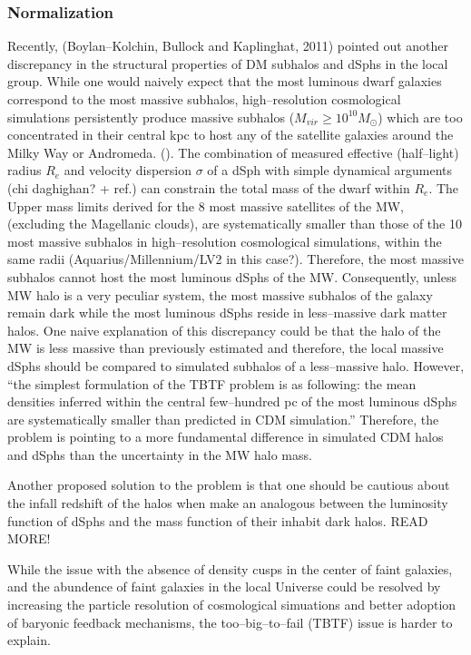 \documentclass[paper=a4, fontsize=11pt]{scrartcl} %
\numberwithin{equation}{section} %
\numberwithin{figure}{section} %
\numberwithin{table}{section} %
\begin{document}
\subsubsection{Normalization}
Recently, (Boylan--Kolchin, Bullock and Kaplinghat, 2011) pointed out another discrepancy in the structural properties of DM subhalos and dSphs in the local group. While one would naively expect that the most luminous dwarf galaxies correspond to the most massive subhalos, high--resolution cosmological simulations persistently produce massive subhalos ($M_{vir} \geq 10^{10} M_\odot$) which are too concentrated in their central kpc to host any of the satellite galaxies around the Milky Way or Andromeda. (\cite{Boylan--Kolchin11}). The combination of measured effective (half--light) radius $R_e$ and velocity dispersion $\sigma$ of a dSph with simple dynamical arguments (chi daghighan? + ref.) can constrain the total mass of the dwarf within $R_e$. The Upper mass limits derived for the 8 most massive satellites of the MW, (excluding the Magellanic clouds), are systematically smaller than those of the 10 most massive subhalos in high--resolution cosmological simulations, within the same radii (Aquarius/Millennium/LV2 in this case?). Therefore, the most massive subhalos cannot host the most luminous dSphs of the MW. Consequently, unless MW halo is a very peculiar system, the most massive subhalos of the galaxy remain dark while the most luminous dSphs reside in less--massive dark matter halos. One naive explanation of this discrepancy could be that the halo of the MW is less massive than previously estimated and therefore, the local massive dSphs should be compared to simulated subhalos of a less--massive halo. However, ``the simplest formulation of the TBTF problem is as following: the mean densities inferred within the central few--hundred pc of the most luminous dSphs are systematically smaller than predicted in CDM simulation.'' Therefore, the problem is pointing to a more fundamental difference in simulated CDM halos and dSphs than the uncertainty in the MW halo mass.

Another proposed solution to the problem is that one should be cautious about the infall redshift of the halos when make an analogous between the luminosity function of dSphs and the mass function of their inhabit dark halos. READ MORE!

While the issue with the absence of density cusps in the center of faint galaxies, and the abundence of faint galaxies in the local Universe could be resolved by increasing the particle resolution of cosmological simuations and better adoption of baryonic feedback mechanisms, the too--big--to--fail (TBTF) issue is harder to explain. 
\end{document}
